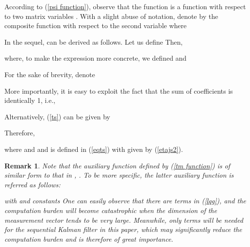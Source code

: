 \documentclass[journal]{IEEEtran}
\newtheorem{remark}{Remark}
\begin{document}
According to (\ref{psi function}), observe that the function  is a function with respect to two matrix variables . With a slight abuse of notation, denote  by the composite function  with respect to the second variable  where 

In the sequel,  can be derived as follows.
Let us define   Then,

where, to make the expression more concrete, we defined  and 

For the sake of brevity, denote

More importantly, it is easy to exploit the fact that the sum of  coefficients  is identically 1, i.e.,

Alternatively, (\ref{ts}) can be given by

Therefore,

where  and  and  is defined in (\ref{eqts}) with  given by (\ref{etajs2}).

\iffalse 


Therefore,   and

By taking the function  into consideration,  can therefore be partitioned into  parts corresponding to the  coefficients , that is,  can be rewritten as

Then (\ref{eqtm}) can be rewritten in the following way

where   For convenience of notation, define  and  Therefore, the function  can be given in a more compact form

where  and  and  is defined in (\ref{ts}) with  given by (\ref{etajs1}), (\ref{etajs2}).

\fi 
\begin{remark}
Note that the auxiliary function  defined by (\ref{tm function}) is of similar form to that in \cite{tac2012sinopoli}, \cite{arxiv2009sinopoli}. To be more specific, the latter auxiliary function is referred as follows:

with  and constants 
One can easily observe that there are  terms in (\ref{lqg}), and the computation burden will become catastrophic when the dimension  of the measurement vector tends to be very large. Meanwhile, only  terms will be needed for the sequential Kalman filter in this paper, which may significantly reduce the computation burden and is therefore of great importance.
\end{remark}
\end{document}
